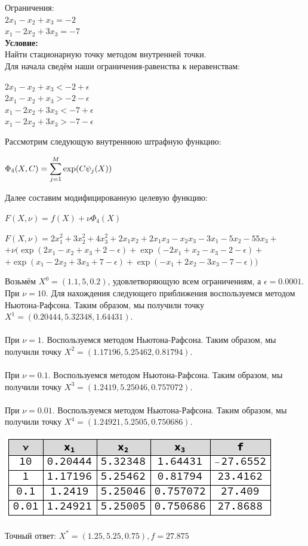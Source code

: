 \documentclass[14pt,a4paper,fleqn]{extarticle}
\begin{document}
	Ограничения:\\
	$2x_1 - x_2 + x_3 = -2$\\
	$x_1 - 2x_2 + 3x_3 = -7$\\
	
	\textbf{Условие:}\\
	Найти стационарную точку методом внутренней точки.\\
	
	Для начала сведём наши ограничения-равенства к неравенствам:
	\begin{center}
		$2x_1 - x_2 + x_3 < -2 + \epsilon$\\
		$2x_1 - x_2 + x_3 > -2 - \epsilon$\\
		$x_1 - 2x_2 + 3x_3 < -7 + \epsilon$\\
		$x_1 - 2x_2 + 3x_3 > -7 - \epsilon$\\
	\end{center}
	
	Рассмотрим следующую внутреннюю штрафную функцию:
	\begin{center}
	$\Phi_4(X,C)=\smashoperator[r]{\sum_{j=1}^{M}} \exp(C\psi_j(X))$
	\end{center}
	Далее составим модифицированную целевую функцию:
	\begin{center}
		$F(X, \nu) = f(X) + \nu \Phi_4(X)$
	\end{center}
	\begin{center}
	\small $F(X, \nu) = 2x_1^2 + 3x_2^2 + 4x_3^2 + 2x_1x_2 + 2x_1x_3 - x_2x_3 - 3x_1 - 5x_2 - 55x_3 +$\\
	$ + \nu (\exp(2x_1-x_2+x_3+2-\epsilon) + \exp(-2x_1+x_2-x_3-2-\epsilon) + $
	$ + \exp(x_1 - 2x_2 + 3x_3 + 7 - \epsilon) + \exp(-x_1 + 2x_2 - 3x_3 - 7 - \epsilon))$
	\end{center}

	Возьмём $X^0 = (1.1, 5, 0.2)$, удовлетворяющую всем ограничениям, а $\epsilon = 0.0001$.
	\newpage
	При $\nu = 10$. Для нахождения следующего приближения воспользуемся методом Ньютона-Рафсона. Таким образом, мы получили точку $X^1 = (0.20444, 5.32348, 1.64431)$.\\\\
	При $\nu = 1$. Воспользуемся методом Ньютона-Рафсона. Таким образом, мы получили точку $X^2 = (1.17196, 5.25462,0.81794)$.\\\\
	При $\nu = 0.1$. Воспользуемся методом Ньютона-Рафсона. Таким образом, мы получили точку $X^3 = (1.2419, 5.25046,0.757072)$.\\\\
	При $\nu = 0.01$. Воспользуемся методом Ньютона-Рафсона. Таким образом, мы получили точку $X^4 = (1.24921, 5.2505,0.750686)$.
	\begin{center}
	\includegraphics[scale=0.55]{pic}
	\end{center}

	Точный ответ: $X^* = (1.25, 5.25, 0.75), f = 27.875$
\end{document}
